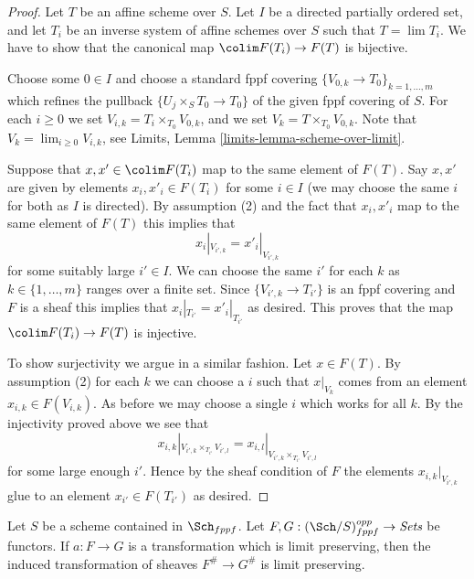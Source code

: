 \begin{proof}
Let $T$ be an affine scheme over $S$.
Let $I$ be a directed partially ordered set, and let
$T_i$ be an inverse system of affine schemes over $S$ such that
$T = \lim T_i$. We have to show that the canonical
map $\colim F(T_i) \to F(T)$ is bijective.

\medskip\noindent
Choose some $0 \in I$ and choose a standard fppf covering
$\{V_{0, k} \to T_{0}\}_{k = 1, \ldots, m}$ which refines
the pullback $\{U_j \times_S T_0 \to T_0\}$ of the given fppf covering of $S$.
For each $i \geq 0$ we set $V_{i, k} = T_i \times_{T_0} V_{0, k}$, and
we set $V_k = T \times_{T_0} V_{0, k}$. Note that
$V_k = \lim_{i \geq 0} V_{i, k}$, see
Limits, Lemma \ref{limits-lemma-scheme-over-limit}.

\medskip\noindent
Suppose that $x, x' \in \colim F(T_i)$ map to the same
element of $F(T)$. Say $x, x'$ are given by elements $x_i, x'_i \in F(T_i)$
for some $i \in I$ (we may choose the same $i$ for both as $I$ is directed).
By assumption (2) and the fact that $x_i, x'_i$ map to the same element
of $F(T)$ this implies that
$$
x_i|_{V_{i', k}} = x'_i|_{V_{i', k}}
$$
for some suitably large $i' \in I$. We can choose the same $i'$ for each
$k$ as $k \in \{1, \ldots, m\}$ ranges over a finite set.
Since $\{V_{i', k} \to T_{i'}\}$
is an fppf covering and $F$ is a sheaf this implies that
$x_i|_{T_{i'}} = x'_i|_{T_{i'}}$ as desired. This proves that the map
$\colim F(T_i) \to F(T)$ is injective.

\medskip\noindent
To show surjectivity we argue in a similar fashion.
Let $x \in F(T)$. By assumption (2) for each $k$ we
can choose a $i$ such that $x|_{V_k}$ comes from an
element $x_{i, k} \in F(V_{i, k})$. As before we may choose a
single $i$ which works for all $k$. By the injectivity
proved above we see that
$$
x_{i, k}|_{V_{i', k} \times_{T_{i'}} V_{i', l}}
=
x_{i, l}|_{V_{i', k} \times_{T_{i'}} V_{i', l}}
$$
for some large enough $i'$. Hence by the sheaf condition of $F$
the elements $x_{i, k}|_{V_{i', k}}$ glue to an element $x_{i'} \in F(T_{i'})$
as desired.
\end{proof}

\begin{lemma}
\label{lemma-sheafify-finite-presentation-map}
Let $S$ be a scheme contained in $\Sch_{fppf}$.
Let $F, G : (\Sch/S)_{fppf}^{opp} \to \textit{Sets}$ be functors.
If $a : F \to G$ is a transformation which is limit preserving,
then the induced transformation of sheaves
$F^\# \to G^\#$ is limit preserving.
\end{lemma}

